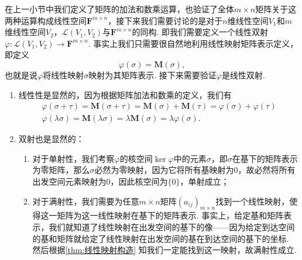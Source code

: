 在上一小节中我们定义了矩阵的加法和数乘运算，也验证了全体$m\times n$矩阵关于这两种运算构成线性空间$\mathbf{F}^{m\times n}$，接下来我们需要讨论的是对于$n$维线性空间$V_1$和$m$维线性空间$V_2$，$\mathcal{L}(V_1,V_2)$与$\mathbf{F}^{m\times n}$的同构. 即我们需要定义一个线性双射$\varphi:\mathcal{L}(V_1,V_2)\to\mathbf{F}^{m\times n}$. 事实上我们只需要很自然地利用线性映射矩阵表示定义，即定义
\[\varphi(\sigma)=\mathbf{M}(\sigma),\]
也就是说$\varphi$将线性映射$\sigma$映射为其矩阵表示. 接下来需要验证$\varphi$是线性双射.
\begin{enumerate}
    \item 线性性是显然的，因为根据矩阵加法和数乘的定义，我们有
          \begin{gather*}
              \varphi(\sigma+\tau)=\mathbf{M}(\sigma+\tau)=\mathbf{M}(\sigma)+\mathbf{M}(\tau)=\varphi(\sigma)+\varphi(\tau) \\
              \varphi(\lambda\sigma)=\mathbf{M}(\lambda\sigma)=\lambda\mathbf{M}(\sigma)=\lambda\varphi(\sigma).
          \end{gather*}

    \item 双射也是显然的：
          \begin{enumerate}
              \item 对于单射性，我们考察$\varphi$的核空间$\ker\varphi$中的元素$\sigma$，即$\sigma$在基下的矩阵表示为零矩阵，那么$\sigma$必然为零映射，因为它将所有基映射为0，故必然将所有出发空间元素映射为0，因此核空间为$\{0\}$，单射成立；

              \item 对于满射性，我们需要为任意$m\times n$矩阵$(a_{ij})_{m\times n}$找到一个线性映射，使得这一矩阵为这一线性映射在基下的矩阵表示. 事实上，给定基和矩阵表示，我们就知道了线性映射在出发空间的基下的像——因为给定到达空间的基和矩阵就给定了线性映射在出发空间的基在到达空间的基下的坐标. 然后根据\autoref{thm:线性映射构造} 知我们一定能找到这一映射，故满射性成立.
          \end{enumerate}
\end{enumerate}

